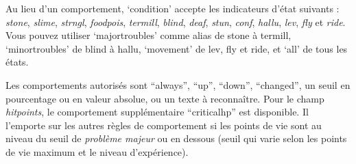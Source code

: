\documentclass[titlepage]{article}
\begin{document}
Au lieu d'un comportement, `condition' accepte les indicateurs d'état suivants :
\textit{stone}, \textit{slime}, \textit{strngl}, \textit{foodpois}, \textit{termill},
\textit{blind}, \textit{deaf}, \textit{stun}, \textit{conf}, \textit{hallu},
\textit{lev}, \textit{fly} et \textit{ride}.
Vous pouvez utiliser `major\textunderscore troubles' comme alias
de stone à termill, `minor\textunderscore troubles' de blind à hallu,
`movement' de lev, fly et ride, et `all' de tous les états.

Les comportements autorisés sont ``always'', ``up'', ``down'', ``changed'', un
seuil en pourcentage ou en valeur absolue, ou un texte à reconnaître.
Pour le champ \textit{hitpoints}, le comportement supplémentaire ``criticalhp''
est disponible.
Il l'emporte sur les autres règles de comportement si les
points de vie sont au niveau du seuil de \textit{problème majeur} ou en dessous
(seuil qui varie selon les points de vie maximum et le niveau d'expérience).
\end{document}
